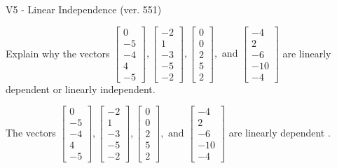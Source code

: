 \begin{exercise}
  \begin{exerciseTitle}V5 - Linear Independence (ver. 551)\end{exerciseTitle}
  \begin{exerciseStatement}
    Explain why the vectors \(\left[\begin{array}{r}
0 \\
-5 \\
-4 \\
4 \\
-5
\end{array}\right] , \left[\begin{array}{r}
-2 \\
1 \\
-3 \\
-5 \\
-2
\end{array}\right] , \left[\begin{array}{r}
0 \\
0 \\
2 \\
5 \\
2
\end{array}\right] , \text{ and } \left[\begin{array}{r}
-4 \\
2 \\
-6 \\
-10 \\
-4
\end{array}\right]\) are linearly dependent or linearly independent.	


  \end{exerciseStatement}
  \begin{exerciseAnswer}
   The vectors \(\left[\begin{array}{r}
0 \\
-5 \\
-4 \\
4 \\
-5
\end{array}\right] , \left[\begin{array}{r}
-2 \\
1 \\
-3 \\
-5 \\
-2
\end{array}\right] , \left[\begin{array}{r}
0 \\
0 \\
2 \\
5 \\
2
\end{array}\right] , \text{ and } \left[\begin{array}{r}
-4 \\
2 \\
-6 \\
-10 \\
-4
\end{array}\right]\) are 
  	 linearly dependent  .
  


  \end{exerciseAnswer}
\end{exercise}